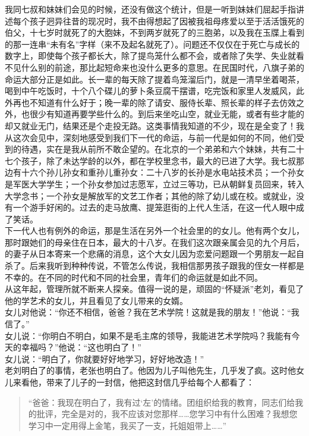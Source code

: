 我同七叔和妹妹们会见的时候，还没有做这个统计，但是一听到妹妹们屈起手指讲述每个孩子迥异往昔的现况时，我不由得想起了因被我祖母疼爱以至于活活饿死的伯父，十七岁时就死了的大胞妹，不到两岁就死了的三胞弟，以及我在玉牒上看到的那一连串“未有名”字样（来不及起名就死了）。问题还不仅仅在于死亡与成长的数字上，即使每个孩子都长大，除了提鸟笼什么都不会，或者除了失学、失业就看不见什么别的前途，那比起短命来也没什么更多的意思。在民国时代，八旗子弟的命运大部分正是如此。长一辈的每天除了提着鸟笼溜后门，就是一清早坐着喝茶，喝到中午吃饭时，十个八个碟儿的萝卜条豆腐干摆谱，吃完饭和家里人发威风，此外再也不知道有什么好于；晚一辈的除了请安、服侍长辈、照长辈的样子去仿效之外，也很少有知道再要学些什么的。到后来坐吃山空，就业无能，或者有些才能的却又就业无门，结果还是个走投无路。这类事情我知道的不少，现在是全变了！我从这次会见中，深刻地感受到我们下一代的命运，与前一代是如何的不同，他们受到的待遇，实在是我从前所不敢企望的。在北京的一个弟弟和六个妹妹，共有二十七个孩子，除了未达学龄的以外，都在学校里念书，最大的已进了大学。我七叔那边有十六个孙儿孙女和重孙儿重孙女：二十八岁的长孙是水电站技术员；一个孙女是军医大学学生；一个孙女参加过志愿军，立过三等功，已从朝鲜复员回来，转入大学念书；一个孙女是解放军的文艺工作者；其他的除了幼儿或在校。或就业，没有一个游手好闲的。过去的走马放鹰、提笼逛街的上代人生活，在这一代人眼中成了笑话。\\

下一代人也有例外的命运，那是生活在另外一个社会里的的女儿。他有两个女儿，那时跟她们的母亲住在日本，最大的十八岁。在我们这次跟亲属会见的九个月后，的妻子从日本寄来一个悲痛的消息，这个大女儿因为恋爱问题跟一个男朋友一起自杀了。后来我听到种种传说，不管怎么传说，我相信那男孩子跟我的侄女一样都是不幸的。在不同的时代和不同的社会里，青年们的命运就是如此不同。\\

从这年起，管理所就不断来人探亲。值得一说的是，顽固的“怀疑派”老刘，看见了他的学艺术的女儿，并且看见了女儿带来的女婿。\\

女儿对他说：“你还不相信，爸爸？我在艺术学院！这就是我的朋友！”他说：“我信了。”\\

女儿说：“你明白不明白，如果不是毛主席的领导，我能进艺术学院吗？我能有今天的幸福吗？”他说：“这也明白了！”\\

女儿说：“明白了，你就要好好地学习，好好地改造！”\\

老刘明白了的事情，老张也明白了。他因为儿子叫他先生，几乎发了疯。这时他女儿来看他，带来了儿子的一封信，他把这封信几乎给每个人都看了：\\

\begin{quote}
	“爸爸：我现在明白了，我有过‘左’的情绪。团组织给我的教育，同志们给我的批评，完全是对的，我不应该对您那样……您学习中有什么困难？我想您学习中一定用得上金笔，我买了一支，托姐姐带上……”\\
\end{quote}
